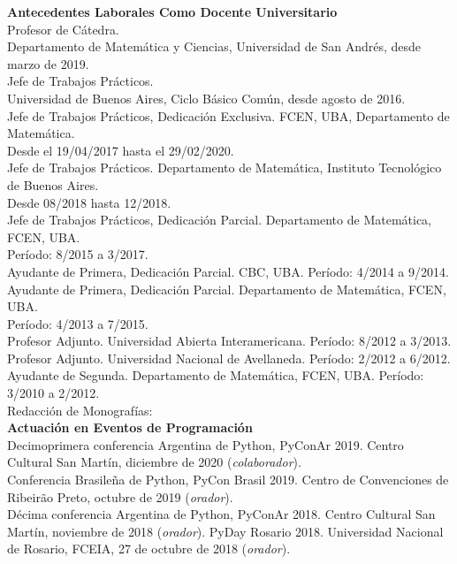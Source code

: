 \textbf{Antecedentes Laborales Como Docente Universitario}\\[6pt]
Profesor de C\'atedra.\\
Departamento de Matem\'atica y Ciencias, 
Universidad de San Andr\'es, desde marzo de 2019.\\[4pt]
Jefe de Trabajos Pr\'acticos.\\Universidad de Buenos Aires,
Ciclo B\'asico Com\'un, desde agosto de 2016.\\[4pt]
Jefe de Trabajos Pr\'acticos, Dedicaci\'on Exclusiva. FCEN, UBA, 
Departamento de Matem\'atica.\\Desde el 19/04/2017 hasta el 29/02/2020.\\[4pt]
Jefe de Trabajos Pr\'acticos. Departamento de Matem\'atica, 
Instituto Tecnol\'ogico de Buenos Aires.\\Desde 08/2018 hasta 12/2018.\\[4pt]
Jefe de Trabajos Pr\'acticos, Dedicaci\'on Parcial. Departamento de Matem\'atica, FCEN, UBA.\\
Per\'iodo: 8/2015 a 3/2017.\\[4pt]
Ayudante de Primera, Dedicaci\'on Parcial. CBC, UBA. Per\'iodo: 4/2014 a 9/2014.\\[4pt]
Ayudante de Primera, Dedicaci\'on Parcial. Departamento de Matem\'atica, FCEN, UBA.\\
Per\'iodo: 4/2013 a 7/2015.\\[4pt]
Profesor Adjunto. Universidad Abierta Interamericana.
Per\'iodo: 8/2012 a 3/2013.\\[4pt]
Profesor Adjunto. Universidad Nacional de Avellaneda.
Per\'iodo: 2/2012 a 6/2012.\\[4pt]
Ayudante de Segunda. Departamento de Matem\'atica, FCEN, UBA. Per\'iodo: 3/2010 a 2/2012.\\[6pt]
Redacci\'on de Monograf\'ias:\\[6pt]

\textbf{Actuaci\'on en Eventos de Programaci\'on}\\[6pt]
Decimoprimera conferencia Argentina de Python, PyConAr 2019. Centro Cultural San Mart\'in,
diciembre de 2020 (\emph{colaborador}).\\[4pt]
Conferencia Brasile\~na de Python, PyCon Brasil 2019. Centro de Convenciones de
Ribeir\~ao Preto, octubre de 2019 (\emph{orador}).\\[4pt]
D\'ecima conferencia Argentina de Python, PyConAr 2018.
Centro Cultural San Mart\'in, noviembre de 2018 (\emph{orador}).
PyDay Rosario 2018. Universidad Nacional de Rosario, FCEIA, 27 de octubre
de 2018 (\emph{orador}).

